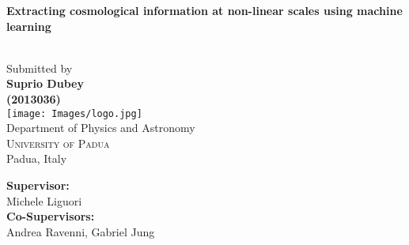 \begin{titlepage}
\begin{center}

\vspace*{.2in}
\parbox{\textwidth}{\centering
\huge \textbf {Extracting cosmological information at non-linear scales using machine learning}
}\\[.2in]

\Large Submitted by \\
\vspace{.1in}
\Large \textbf{Suprio Dubey}\\
\textbf{(2013036)}\\[.5in]

\texttt{[image: Images/logo.jpg]}\\[0.5in]
\Large{Department of Physics and Astronomy}\\
\normalsize
\textsc{University of Padua}\\
Padua, Italy \\
\vspace{0.2cm}

\vfill

\vspace{\fill}
\hfill
\begin{minipage}{0.4\textwidth}
    \raggedleft %
    \large
    \textbf{Supervisor:}\\
    Michele Liguori\\
    \vspace{0.2cm}
    \textbf{Co-Supervisors:}\\
    Andrea Ravenni, Gabriel Jung
\end{minipage}
 

\end{center}
\end{titlepage}


